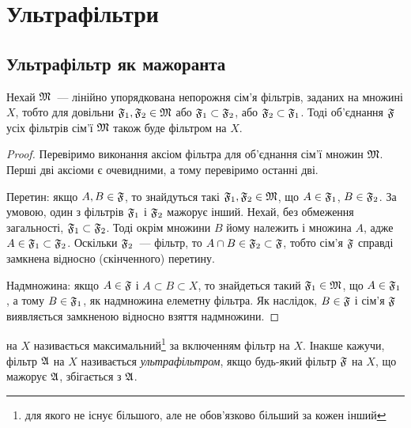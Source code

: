 \chapter{Ультрафільтри}

\section{Ультрафільтр як мажоранта} %

\begin{lemma}
    \label{lem:linear-filter-set-upper-bound}
    Нехай $\frak M$~--- лінійно упорядкована непорожня сім'я фільтрів, заданих на множині $X$, тобто для довільни $\frak F_1, \frak F_2 \in \frak M$ або $\frak F_1 \subset \frak F_2$, або $\frak F_2 \subset \frak F_1$.  Тоді об'єднання $\frak F$ усіх фільтрів сім'ї $\frak M$ також буде фільтром на $X$.
\end{lemma}
\begin{proof}
    Перевіримо виконання аксіом фільтра для об'єднання сім'ї множин $\frak M$. Перші дві аксіоми є очевидними, а тому перевіримо останні дві. \medskip
    
    Перетин: якщо $A, B \in \frak F$, то знайдуться такі $\frak F_1, \frak F_2 \in \frak M$, що $A \in \frak F_1$, $B \in \frak F_2$. За умовою, один з фільтрів $\frak F_1$ і $\frak F_2$ мажорує інший. Нехай, без обмеження загальності, $\frak F_1 \subset \frak F_2$.  Тоді окрім множини $B$ йому належить і множина $A$, адже $A \in \frak F_1 \subset \frak F_2$. Оскільки $\frak F_2$~--- фільтр, то $A \cap B \in \frak F_2 \subset \frak F$, тобто сім'я $\frak F$ справді замкнена відносно (скінченного) перетину. \medskip
    
    Надмножина: якщо $A \in \frak F$ і $A \subset B \subset X$, то знайдеться такий $\frak F_1 \in \frak M$, що $A \in \frak F_1$, а тому $B \in \frak F_1$, як надмножина елеметну фільтра.  Як наслідок, $B \in \frak F$ і сім'я $\frak F$ виявляється замкненою відносно взяття надмножини.
\end{proof}

\begin{definition}
     на $X$ називається максимальний\footnote{для якого не існує більшого, але не обов'язково більший за кожен інший} за включенням фільтр на $X$.  Інакше кажучи, фільтр $\frak A$ на $X$ називається \emph{ультрафільтром}, якщо будь-який фільтр $\frak F$ на $X$, що мажорує $\frak A$, збігається з $\frak A$.
\end{definition}

